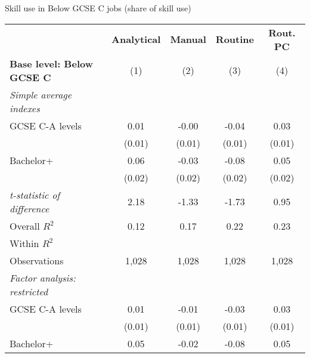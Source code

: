 \begin{center}
\begin{threeparttable}[!h]
\caption{Skill use in Below GCSE C jobs (share of skill use)}
\label{tab:skillRegs}
\begin{tabular}{lcccc}
\toprule
\toprule
&\multicolumn{1}{c}{\textbf{Analytical}}&\multicolumn{1}{c}{\textbf{Manual}}&\multicolumn{1}{c}{\textbf{Routine}}&\multicolumn{1}{c}{\textbf{Rout. PC}} \\
\textbf{Base level: Below GCSE C}&\multicolumn{1}{c}{(1)}&\multicolumn{1}{c}{(2)}&\multicolumn{1}{c}{(3)}&\multicolumn{1}{c}{(4)} \\
\midrule
\textit{Simple average indexes}\vspace{1mm} \\ 
\hspace{3mm}GCSE C-A levels&        0.01         &       -0.00         &       -0.04\sym{**} &        0.03\sym{**} \\
                    &      (0.01)         &      (0.01)         &      (0.01)         &      (0.01)         \\
\hspace{3mm}Bachelor+&        0.06\sym{**} &       -0.03         &       -0.08\sym{***}&        0.05\sym{*}  \\
                    &      (0.02)         &      (0.02)         &      (0.02)         &      (0.02)         \\
\textit{t-statistic of difference}&        2.18         &       -1.33         &       -1.73         &        0.95         \\
\midrule Overall $ R^2$&        0.12         &        0.17         &        0.22         &        0.23         \\
Within $ R^2$       &                     &                     &                     &                     \\
Observations        &       1,028         &       1,028         &       1,028         &       1,028         \\
\midrule \vspace{1mm}\textit{Factor analysis: restricted} \\ 
\hspace{3mm}GCSE C-A levels&        0.01         &       -0.01         &       -0.03\sym{**} &        0.03\sym{**} \\
                    &      (0.01)         &      (0.01)         &      (0.01)         &      (0.01)         \\
\hspace{3mm}Bachelor+&        0.05\sym{**} &       -0.02         &       -0.08\sym{***}&        0.05\sym{**} \\

\end{tabular}
\end{threeparttable}
\end{center}
